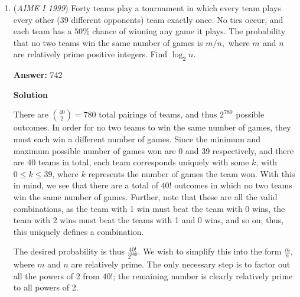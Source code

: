 \begin{enumerate}
 Let \(\angle OBP = \theta\). Then
 \[\sin \theta = \frac{21}{3\sqrt{130}}, \qquad \cos \theta = \frac{27}{3\sqrt{130}}.\]

 Using the double-angle identity,
 \[\sin(2\theta) = 2\sin \theta \cos \theta= 2\left(\frac{21}{3\sqrt{130}}\right)\left(\frac{27}{3\sqrt{130}}\right)= \frac{1134}{1170}= \frac{63}{65}.\]

 Now we compute the area of \(\triangle ABC\) using the formula \(\frac{1}{2}ab\sin C\):
 \[[ABC] = \frac{1}{2}(50)(27+x)\left(\frac{63}{65}\right)= \frac{315}{13}(27+x).\]

 Equating the two expressions for the area,
 \[1050 + 21x = \frac{315}{13}(27+x).\]

 Solving,
 \[\frac{13}{15}x + \frac{130}{3} = 27 + x,\]
 \[\frac{49}{3} = \frac{2}{15}x,\]so
 \[x = \frac{245}{2}.\]

 Finally, we compute the perimeter of \(\triangle ABC\):
 \[2(23+27) + 2\left(\frac{245}{2}\right) = \boxed{345}.\]



	\item (\textit{AIME I 1999}) Forty teams play a tournament in which every team plays every other ($39$ different opponents) team exactly once.  No ties occur, and each team has a $50 \%$ chance of winning any game it plays.  The probability that no two teams win the same number of games is $m/n,$ where $m_{}$ and $n_{}$ are relatively prime positive integers.  Find $\log_2 n.$

 \textbf{Answer: }742



\textbf{Solution}

There are ${40 \choose 2} = 780$ total pairings of teams, and thus $2^{780}$ possible outcomes. In order for no two teams to win the same number of games, they must each win a different number of games. Since the minimum and maximum possible number of games won are 0 and 39 respectively, and there are 40 teams in total, each team corresponds uniquely with some $k$, with $0 \leq k \leq 39$, where $k$ represents the number of games the team won. With this in mind, we see that there are a total of $40!$ outcomes in which no two teams win the same number of games. Further, note that these are all the valid combinations, as the team with 1 win must beat the team with 0 wins, the team with 2 wins must beat the teams with 1 and 0 wins, and so on; thus, this uniquely defines a combination.

 
The desired probability is thus $\frac{40!}{2^{780}}$. We wish to simplify this into the form $\frac{m}{n}$, where $m$ and $n$ are relatively prime. The only necessary step is to factor out all the powers of 2 from $40!$; the remaining number is clearly relatively prime to all powers of 2. 


\end{enumerate}
